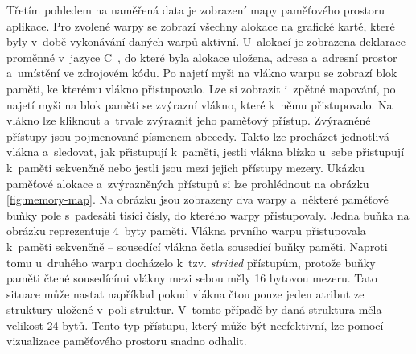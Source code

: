 
Třetím pohledem na naměřená data je zobrazení mapy paměťového prostoru aplikace. Pro zvolené warpy se zobrazí všechny alokace na grafické kartě, které byly v~době vykonávání daných warpů aktivní. U~alokací je zobrazena deklarace proměnné v~jazyce C~, do které byla alokace uložena, adresa a~adresní prostor a~umístění ve zdrojovém kódu. Po najetí myši na vlákno warpu se zobrazí blok paměti, ke kterému vlákno přistupovalo. Lze si zobrazit i~zpětné mapování, po najetí myši na blok paměti se zvýrazní vlákno, které k~němu přistupovalo. Na vlákno lze kliknout a~trvale zvýraznit jeho paměťový přístup. Zvýrazněné přístupy jsou pojmenované písmenem abecedy. Takto lze procházet jednotlivá vlákna a~sledovat, jak přistupují k~paměti, jestli vlákna blízko u~sebe přistupují k~paměti sekvenčně nebo jestli jsou mezi jejich přístupy mezery. Ukázku paměťové alokace a~zvýrazněných přístupů si lze prohlédnout na obrázku \ref{fig:memory-map}. Na obrázku jsou zobrazeny dva warpy a~některé paměťové buňky pole s~padesáti tisíci čísly, do kterého warpy přistupovaly. Jedna buňka na obrázku reprezentuje 4~byty paměti. Vlákna prvního warpu přistupovala k~paměti sekvenčně -- sousedící vlákna četla sousedící buňky paměti. Naproti tomu u~druhého warpu docházelo k~tzv. \emph{strided} přístupům, protože buňky paměti čtené sousedícími vlákny mezi sebou měly 16 bytovou mezeru. Tato situace může nastat například pokud vlákna čtou pouze jeden atribut ze struktury uložené v~poli struktur. V~tomto případě by daná struktura měla velikost 24 bytů. Tento typ přístupu, který může být neefektivní, lze pomocí vizualizace paměťového prostoru snadno odhalit.
